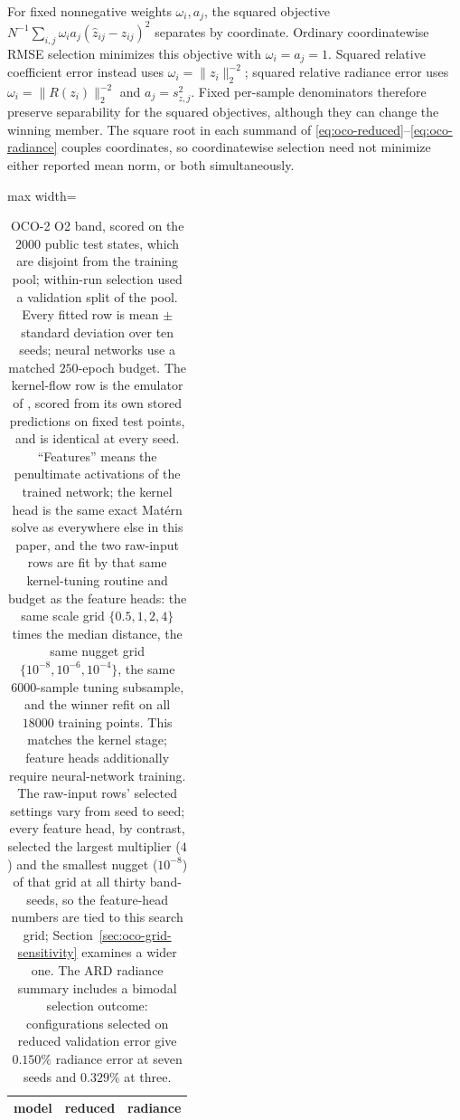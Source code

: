 For fixed nonnegative weights $\omega_i,a_j$, the squared objective
$N^{-1}\sum_{i,j}\omega_i a_j(\hat z_{ij}-z_{ij})^2$ separates by
coordinate. Ordinary coordinatewise RMSE selection minimizes this
objective with $\omega_i=a_j=1$. Squared relative coefficient error instead
uses $\omega_i=\|z_i\|_2^{-2}$; squared relative radiance error uses
$\omega_i=\|R(z_i)\|_2^{-2}$ and $a_j=s_{z,j}^2$. Fixed per-sample
denominators therefore preserve separability for the squared objectives,
although they can change the winning member. The square root in each
summand of \eqref{eq:oco-reduced}--\eqref{eq:oco-radiance} couples
coordinates, so coordinatewise selection need not minimize either reported
mean norm, or both simultaneously.

\begin{table}[t]
\centering
\caption{OCO-2 O2 band, scored on the $2000$ public test states, which are
disjoint from the training pool; within-run selection used a validation
split of the pool. Every fitted row is mean $\pm$ standard deviation over ten
seeds; neural networks use a matched $250$-epoch budget. The
kernel-flow row is the emulator of \citet{susiluoto2025radiative}, scored
from its own stored predictions on fixed test points, and is identical at
every seed. ``Features'' means the penultimate
activations of the trained network; the kernel head is the same exact
Mat\'ern solve as everywhere else in this paper, and the two raw-input rows
are fit by that same kernel-tuning routine and budget as the feature heads:
the same scale grid $\{0.5,1,2,4\}$ times the median distance, the same
nugget grid $\{10^{-8},10^{-6},10^{-4}\}$, the same $6000$-sample tuning
subsample, and the winner refit on all $18000$ training points. This matches the kernel stage; feature heads additionally require neural-network training. The
raw-input rows' selected settings vary from seed to seed; every feature head,
by contrast, selected the largest multiplier ($4$) and the smallest nugget
($10^{-8}$) of that grid at all thirty band-seeds, so the feature-head
numbers are tied to this search grid; Section~\ref{sec:oco-grid-sensitivity}
examines a wider one. The ARD radiance summary includes a bimodal selection
outcome: configurations selected on reduced validation error give
$0.150\%$ radiance error at seven seeds and $0.329\%$ at three.}
\label{tab:oco2}
\begin{adjustbox}{max width=\linewidth}
\begin{tabular}{lcc}
\toprule
model & reduced & radiance \\
\midrule

\end{tabular}
\end{adjustbox}
\end{table}
